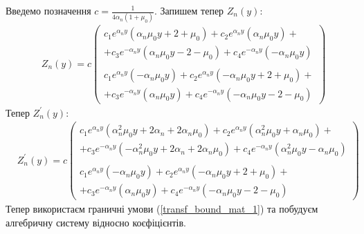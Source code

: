 Введемо позначення $c = \frac{1}{4\alpha_n (1 + \mu_0)}$. \newline
Запишем тепер $Z_n(y)$:
\begin{align*}
    &Z_n(y) = c
    \begin{pmatrix}
        c_1 e^{\alpha_n y} (\alpha_n \mu_0 y + 2 + \mu_0) + c_2 e^{\alpha_n y} (\alpha_n \mu_0 y) + 
        \\ + c_3 e^{-\alpha_n y} (\alpha_n \mu_0 y - 2 - \mu_0) + c_4 e^{-\alpha_n y} (-\alpha_n \mu_0 y) \\
        \\
        c_1 e^{\alpha_n y} (-\alpha_n \mu_0 y) + c_2 e^{\alpha_n y} (-\alpha_n \mu_0 y + 2 + \mu_0) + 
        \\ + c_3 e^{-\alpha_n y} (\alpha_n \mu_0 y) + c_4 e^{-\alpha_n y} (-\alpha_n \mu_0 y - 2 - \mu_0)
    \end{pmatrix}
\end{align*}
Тепер $Z_n^{'}(y)$:
\begin{align*}
    &Z_n^{'}(y) = c
    \begin{pmatrix}
        c_1 e^{\alpha_n y} (\alpha_n^2 \mu_0 y + 2 \alpha_n + 2 \alpha_n \mu_0) + c_2 e^{\alpha_n y} (\alpha_n^2 \mu_0 y + \alpha_n \mu_0) + 
        \\ + c_3 e^{-\alpha_n y} (-\alpha_n^2 \mu_0 y + 2 \alpha_n + 2 \alpha_n \mu_0) + c_4 e^{-\alpha_n y} (\alpha_n^2 \mu_0 y - \alpha_n \mu_0) \\
        \\
        c_1 e^{\alpha_n y} (-\alpha_n \mu_0 y) + c_2 e^{\alpha_n y} (-\alpha_n \mu_0 y + 2 + \mu_0) + 
        \\ + c_3 e^{-\alpha_n y} (\alpha_n \mu_0 y) + c_4 e^{-\alpha_n y} (-\alpha_n \mu_0 y - 2 - \mu_0)
    \end{pmatrix}
\end{align*}
Тепер використаєм граничні умови (\ref{transf_bound_mat_1}) та побудуєм алгебричну систему відносно коєфіцієнтів.

